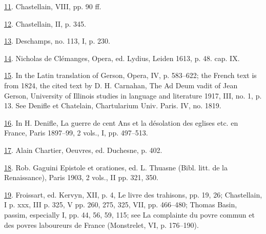 \protect\hypertarget{23_NOTES.xhtmlux5cux23id_1910}{\protect\hyperlink{10_Chapter_Three__THE_HEROIC_DREAM.xhtmlux5cux23id_1909}{11}}.
Chastellain, VIII, pp. 90 ff.

\protect\hypertarget{23_NOTES.xhtmlux5cux23id_1908}{\protect\hyperlink{10_Chapter_Three__THE_HEROIC_DREAM.xhtmlux5cux23id_1907}{12}}.
Chastellain, II, p. 345.

\protect\hypertarget{23_NOTES.xhtmlux5cux23id_1906}{\protect\hyperlink{10_Chapter_Three__THE_HEROIC_DREAM.xhtmlux5cux23id_1905}{13}}.
Deschamps, no. 113, I, p. 230.

\protect\hypertarget{23_NOTES.xhtmlux5cux23page_405}{\protect\hyperlink{10_Chapter_Three__THE_HEROIC_DREAM.xhtmlux5cux23id_1904}{14}}.
Nicholas de Clémanges, Opera, ed. Lydius, Leiden 1613, p. 48. cap. IX.

\protect\hypertarget{23_NOTES.xhtmlux5cux23id_1903}{\protect\hyperlink{10_Chapter_Three__THE_HEROIC_DREAM.xhtmlux5cux23id_1902}{15}}.
In the Latin translation of Gerson, Opera, IV, p. 583--622; the French
text is from 1824, the cited text by D. H. Carnahan, The Ad Deum vadit
of Jean Gerson, University of Illinois studies in language and
literature 1917, III, no. 1, p. 13. See Denifle et Chatelain,
Chartularium Univ. Paris. IV, no. 1819.

\protect\hypertarget{23_NOTES.xhtmlux5cux23id_1901}{\protect\hyperlink{10_Chapter_Three__THE_HEROIC_DREAM.xhtmlux5cux23id_1900}{16}}.
In H. Denifle, La guerre de cent Ans et la désolation des eglises etc.
en France, Paris 1897--99, 2 vols., I, pp. 497--513.

\protect\hypertarget{23_NOTES.xhtmlux5cux23id_1899}{\protect\hyperlink{10_Chapter_Three__THE_HEROIC_DREAM.xhtmlux5cux23id_1898}{17}}.
Alain Chartier, Oeuvres, ed. Duchesne, p. 402.

\protect\hypertarget{23_NOTES.xhtmlux5cux23id_1897}{\protect\hyperlink{10_Chapter_Three__THE_HEROIC_DREAM.xhtmlux5cux23id_1896}{18}}.
Rob. Gaguini Epistole et orationes, ed. L. Thuasne (Bibl. litt. de la
Renaissance), Paris 1903, 2 vols., II pp. 321, 350.

\protect\hypertarget{23_NOTES.xhtmlux5cux23id_1895}{\protect\hyperlink{10_Chapter_Three__THE_HEROIC_DREAM.xhtmlux5cux23id_1894}{19}}.
Froissart, ed. Kervyn, XII, p. 4, Le livre des trahisons, pp. 19, 26;
Chastellain, I p. xxx, III p. 325, V pp. 260, 275, 325, VII, pp.
466--480; Thomas Basin, passim, especially I, pp. 44, 56, 59, 115; see
La complainte du povre commun et des povres laboureurs de France
(Monstrelet, VI, p. 176--190).


